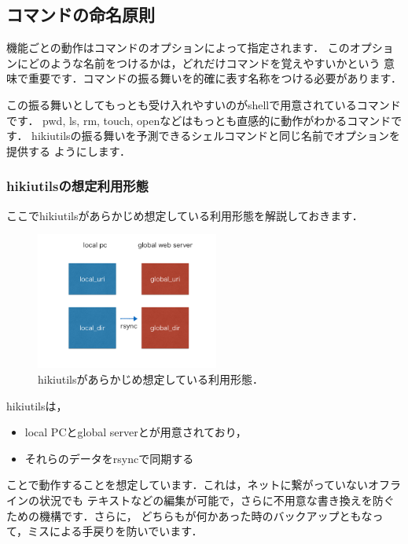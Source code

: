 
\subsection{コマンドの命名原則}
機能ごとの動作はコマンドのオプションによって指定されます．
このオプションにどのような名前をつけるかは，どれだけコマンドを覚えやすいかという
意味で重要です．コマンドの振る舞いを的確に表す名称をつける必要があります．

この振る舞いとしてもっとも受け入れやすいのがshellで用意されているコマンドです．
pwd, ls, rm, touch, openなどはもっとも直感的に動作がわかるコマンドです．
hikiutilsの振る舞いを予測できるシェルコマンドと同じ名前でオプションを提供する
ようにします．

\subsubsection{hikiutilsの想定利用形態}
ここでhikiutilsがあらかじめ想定している利用形態を解説しておきます．

\begin{figure}[htbp]\begin{center}
\includegraphics[width=6cm,bb=0 0 442 432]{../figs/./hikiutils_yamane_09_copy.002.jpg}
\caption{hikiutilsがあらかじめ想定している利用形態．}
\label{default}\end{center}\end{figure}
hikiutilsは，

\begin{itemize}
\item local PCとglobal serverとが用意されており，
\item それらのデータをrsyncで同期する
\end{itemize}
ことで動作することを想定しています．これは，ネットに繋がっていないオフラインの状況でも
テキストなどの編集が可能で，さらに不用意な書き換えを防ぐための機構です．さらに，
どちらもが何かあった時のバックアップともなって，ミスによる手戻りを防いでいます．

